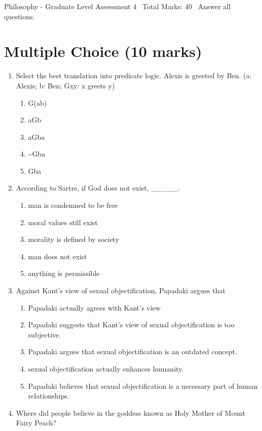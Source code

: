 \documentclass[12pt]{article}
\begin{document}
\begin{center}
Philosophy - Graduate Level Assessment 4 \
Total Marks: 40 \
Answer all questions.
\end{center}

\section*{Multiple Choice (10 marks)}
\begin{enumerate}[label=\arabic*.]
\item Select the best translation into predicate logic. Alexis is greeted by Ben. (a: Alexis; b:
Ben; Gxy: x greets y)
\begin{enumerate}[label=(\alph*)]
    \item G(ab)
    \item aGb
    \item aGba
    \item \textasciitilde{}Gba
    \item Gba
\end{enumerate}
\item According to Sartre, if God does not exist, \_\_\_\_\_.
\begin{enumerate}[label=(\alph*)]
    \item man is condemned to be free
    \item moral values still exist
    \item morality is defined by society
    \item man does not exist
    \item anything is permissible
\end{enumerate}
\item Against Kant's view of sexual objectification, Papadaki argues that
\begin{enumerate}[label=(\alph*)]
    \item Papadaki actually agrees with Kant's view
    \item Papadaki suggests that Kant's view of sexual objectification is too subjective.
    \item Papadaki argues that sexual objectification is an outdated concept.
    \item sexual objectification actually enhances humanity.
    \item Papadaki believes that sexual objectification is a necessary part of human relationships.
\end{enumerate}
\item Where did people believe in the goddess known as Holy Mother of Mount Fairy Peach?

\end{enumerate}
\end{document}
